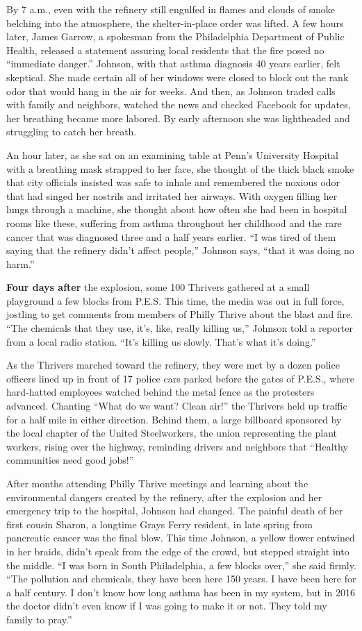 By 7 a.m., even with the refinery still engulfed in flames and clouds of
smoke belching into the atmosphere, the shelter-in-place order was
lifted. A few hours later, James Garrow, a spokesman from the
Philadelphia Department of Public Health, released a statement assuring
local residents that the fire posed no ``immediate danger.'' Johnson,
with that asthma diagnosis 40 years earlier, felt skeptical. She made
certain all of her windows were closed to block out the rank odor that
would hang in the air for weeks. And then, as Johnson traded calls with
family and neighbors, watched the news and checked Facebook for updates,
her breathing became more labored. By early afternoon she was
lightheaded and struggling to catch her breath.

An hour later, as she sat on an examining table at Penn's University
Hospital with a breathing mask strapped to her face, she thought of the
thick black smoke that city officials insisted was safe to inhale and
remembered the noxious odor that had singed her nostrils and irritated
her airways. With oxygen filling her lungs through a machine, she
thought about how often she had been in hospital rooms like these,
suffering from asthma throughout her childhood and the rare cancer that
was diagnosed three and a half years earlier. ``I was tired of them
saying that the refinery didn't affect people,'' Johnson says, ``that it
was doing no harm.''

\textbf{Four days after} the explosion, some 100 Thrivers gathered at a
small playground a few blocks from P.E.S. This time, the media was out
in full force, jostling to get comments from members of Philly Thrive
about the blast and fire. ``The chemicals that they use, it's, like,
really killing us,'' Johnson told a reporter from a local radio station.
``It's killing us slowly. That's what it's doing.''

As the Thrivers marched toward the refinery, they were met by a dozen
police officers lined up in front of 17 police cars parked before the
gates of P.E.S., where hard-hatted employees watched behind the metal
fence as the protesters advanced. Chanting ``What do we want? Clean
air!'' the Thrivers held up traffic for a half mile in either direction.
Behind them, a large billboard sponsored by the local chapter of the
United Steelworkers, the union representing the plant workers, rising
over the highway, reminding drivers and neighbors that ``Healthy
communities need good jobs!''

After months attending Philly Thrive meetings and learning about the
environmental dangers created by the refinery, after the explosion and
her emergency trip to the hospital, Johnson had changed. The painful
death of her first cousin Sharon, a longtime Grays Ferry resident, in
late spring from pancreatic cancer was the final blow. This time
Johnson, a yellow flower entwined in her braids, didn't speak from the
edge of the crowd, but stepped straight into the middle. ``I was born in
South Philadelphia, a few blocks over,'' she said firmly. ``The
pollution and chemicals, they have been here 150 years. I have been here
for a half century. I don't know how long asthma has been in my system,
but in 2016 the doctor didn't even know if I was going to make it or
not. They told my family to pray.''

